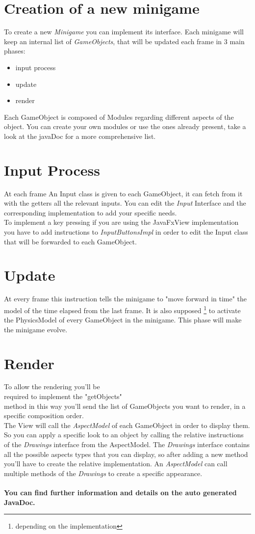 \documentclass[a4paper,12pt]{report}
\begin{document}
\section*{Creation of a new minigame}
To create a new \textit{Minigame} you can implement its interface.
Each minigame will keep an internal list of \textit{GameObjects}, that will be updated each frame in 3 main phases:
\begin{itemize}
	\item input process
	\item update
	\item render
\end{itemize}
Each GameObject is composed of Modules regarding different aspects of the object.
You can create your own modules or use the ones already present, take a look at the javaDoc for a more comprehensive list.
\section*{Input Process}
At each frame An Input class is given to each GameObject, it can fetch from it with the getters all the relevant inputs.
You can edit the \textit{Input} Interface and the corresponding implementation to add your specific needs.\\
To implement a key pressing if you are using the JavaFxView implementation you have to add instructions to \textit{InputButtonsImpl} in order to edit the Input class that will be forwarded to each GameObject.

\section*{Update}
At every frame this instruction tells the minigame to "move forward in time" the model of the time elapsed from the last frame. It is also supposed \footnote{depending on the implementation} to activate the PhysicsModel of every GameObject in the minigame.
This phase will make the minigame evolve.
\section*{Render}
To allow the rendering you'll be\\ required to implement the "getObjects"\\ method in this way you'll send the list of GameObjects you want to render, in a specific composition order.\\
The View will call the \textit{AspectModel} of each GameObject in order to display them.\\
So you can apply a specific look to an object by calling the relative instructions of the \textit{Drawings} interface from the AspectModel.
The \textit{Drawings} interface contains all the possible aspects types that you can display, so after adding a new method you'll have to create the relative implementation.
An \textit{AspectModel} can call multiple methods of the \textit{Drawings} to create a specific appearance.
\\\\
\textbf{You can find further information and details on the auto generated JavaDoc.}
\end{document}
